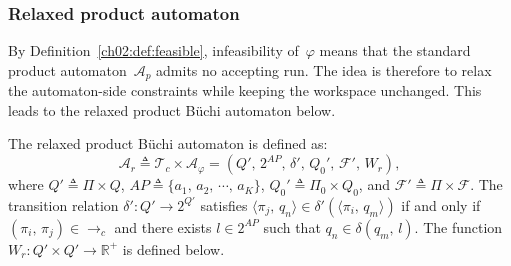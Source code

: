 \subsubsection{Relaxed product automaton}
\label{ch03:subsec:relaxed-prod}

By Definition~\ref{ch02:def:feasible}, infeasibility of~$\varphi$ means that
the standard product automaton~$\mathcal{A}_p$ admits no accepting run. The
idea is therefore to relax the automaton-side constraints while keeping
the workspace unchanged. This leads to the relaxed product
B\"uchi automaton below.

\begin{definition}\label{ch03:def:relaxpro}
The relaxed product B\"uchi automaton is defined as:
\begin{equation}
\mathcal{A}_r \triangleq \mathcal{T}_c \times \mathcal{A}_{\varphi}
= (Q',\, 2^{AP},\, \delta',\, Q_0',\, \mathcal{F}',\, W_r),
\label{ch03:eq:relaxed-pba}
\end{equation}
where $Q' \triangleq \Pi \times Q$,
$AP \triangleq \{a_1,\, a_2,\, \cdots,\, a_K\}$,
$Q_0' \triangleq \Pi_0 \times Q_0$, and
$\mathcal{F}' \triangleq \Pi \times \mathcal{F}$. The transition relation
$\delta' : Q' \rightarrow 2^{Q'}$ satisfies
$\langle \pi_j,\, q_n \rangle \in \delta'(\langle \pi_i,\, q_m \rangle)$ if and
only if $(\pi_i,\, \pi_j) \in \longrightarrow_c$ and there exists
$l \in 2^{AP}$ such that $q_n \in \delta(q_m,\, l)$. The function
$W_r : Q' \times Q' \rightarrow \mathbb{R}^{+}$ is defined below.
\end{definition}

